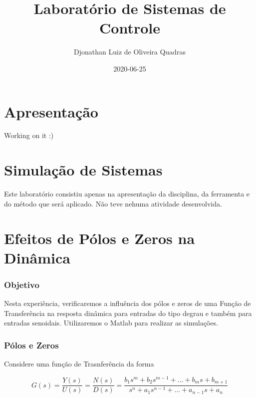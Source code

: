 \documentclass[
]{book}
\title{Laboratório de Sistemas de Controle}
\author{Djonathan Luiz de Oliveira Quadras}
\date{2020-06-25}
\begin{document}
\maketitle

{
\setcounter{tocdepth}{1}
\tableofcontents
}
\hypertarget{apresentauxe7uxe3o}{%
\chapter*{Apresentação}\label{apresentauxe7uxe3o}}

Working on it :)

\hypertarget{simulauxe7uxe3o-de-sistemas}{%
\chapter{Simulação de Sistemas}\label{simulauxe7uxe3o-de-sistemas}}

Este laboratório consistiu apenas na apresentação da disciplina, da ferramenta e do método que será aplicado. Não teve nehuma atividade desenvolvida.

\hypertarget{efeitos-de-puxf3los-e-zeros-na-dinuxe2mica}{%
\chapter{Efeitos de Pólos e Zeros na Dinâmica}\label{efeitos-de-puxf3los-e-zeros-na-dinuxe2mica}}

\hypertarget{objetivo}{%
\subsection*{Objetivo}\label{objetivo}}

Nesta experiência, verificaremos a influência dos pólos e zeros de uma Função de Transferência na resposta dinâmica para entradas do tipo degrau e também para entradas senoidais. Utilizaremos o Matlab para realizar as
simulações.

\hypertarget{puxf3los-e-zeros}{%
\subsection*{Pólos e Zeros}\label{puxf3los-e-zeros}}

Considere uma função de Trasnferência da forma

\[
G(s) = \frac{Y(s)}{U(s)} = \frac{N(s)}{D(s)} = \frac{b_1s^m +b_2s^{m-1} + \dots + b_ms + b_{m+1}}{s^n + a_1s^{n-1}+ \dots + a_{n-1}s + a_n}
\]
\end{document}
